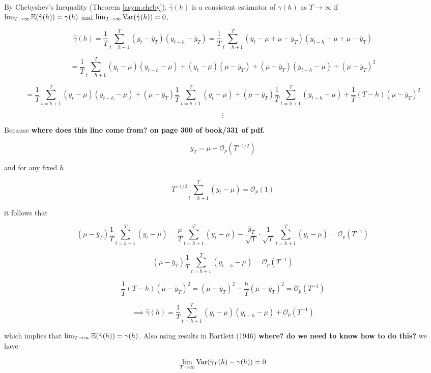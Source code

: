 By Chebyshev's Inequality (Theorem \ref{asym.cheby}), \(\hat{\gamma}(h) \) is a consistent estimator of \(\gamma(h)\) as \(T \to \infty\) if \\ \(\lim_{T \to \infty} \mathbb{E}(\hat{\gamma}(h)) = \gamma(h)\) and \(\lim_{T \to \infty} \mathrm{Var}(\hat{\gamma}(h)) = 0\).

\[
\hat{\gamma}(h) = \frac{1}{T} \sum_{t=h+1}^T(y_t - \overline{y}_T)(y_{t-h} - \overline{y}_T) = \frac{1}{T} \sum_{t=h+1}^T(y_t - \mu + \mu - \overline{y}_T)(y_{t-h} - \mu + \mu -  \overline{y}_T)
\]

\[
= \frac{1}{T} \sum_{t=h+1}^T(y_t - \mu)(y_{t-h} - \mu) + (y_t - \mu)(\mu -  \overline{y}_T) + (\mu - \overline{y}_T)(y_{t-h} - \mu) + (\mu - \overline{y}_T)^2
\]

\[
= \frac{1}{T} \sum_{t=h+1}^T(y_t - \mu)(y_{t-h} - \mu) + (\mu -  \overline{y}_T)  \frac{1}{T} \sum_{t=h+1}^T (y_t - \mu)+ (\mu - \overline{y}_T) \frac{1}{T} \sum_{t=h+1}^T(y_{t-h} - \mu) + \frac{1}{T}(T - h)(\mu - \overline{y}_T)^2
\]



\[
\vdots
\]

Because \textbf{where does this line come from? on page 300 of book/331 of pdf.}

\[
\overline{y}_T = \mu + \mathcal{O}_p(T^{-1/2})
\]

and for any fixed \(h\)

\[
T^{-1/2} \sum_{t=h+1}^T (y_t - \mu) = \mathcal{O}_p(1)
\]

it follows that 

\[
 (\mu -  \overline{y}_T)  \frac{1}{T} \sum_{t=h+1}^T (y_t - \mu) =  \frac{\mu}{T} \sum_{t=h+1}^T (y_t - \mu) -  \frac{\overline{y}_T}{\sqrt{T}} \cdot \frac{1}{\sqrt{T}} \sum_{t=h+1}^T (y_t - \mu) =\mathcal{O}_p(T^{-1})
\]

\[
 (\mu - \overline{y}_T) \frac{1}{T} \sum_{t=h+1}^T(y_{t-h} - \mu)  =\mathcal{O}_p(T^{-1})
\]

\[
\frac{1}{T}(T - h)(\mu - \overline{y}_T)^2 = (\mu - \overline{y}_T)^2 - \frac{h}{T}(\mu - \overline{y}_T)^2 = \mathcal{O}_p(T^{-1})
\]

\[
\implies \hat{\gamma}(h)  = \frac{1}{T} \sum_{t=h+1}^T(y_t - \mu)(y_{t-h} - \mu) + \mathcal{O}_p(T^{-1}) 
\]

which implies that \(\lim_{T \to \infty} \mathbb{E}(\hat{\gamma}(h)) = \gamma(h)\). Also using results in Bartlett (1946) \textbf{where? do we need to know how to do this?} we have

\[
\lim_{T \to \infty} \mathrm{Var}(\hat{\gamma}_T(h) - \gamma(h)) = 0
\]

